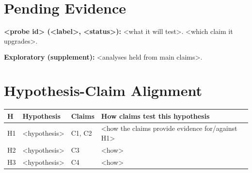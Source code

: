 \documentclass[11pt]{article}
\begin{document}
\section*{Pending Evidence}

\textbf{<probe id> (<label>, <status>):} <what it will test>. <which claim it upgrades>.

\textbf{Exploratory (supplement):} <analyses held from main claims>.

\section*{Hypothesis-Claim Alignment}

\begin{small}
\begin{tabularx}{\textwidth}{@{}p{} p{} p{} X@{}}
\toprule
H & Hypothesis & Claims & How claims test this hypothesis \\
\midrule
H1 & <hypothesis> & C1, C2 & <how the claims provide evidence for/against H1> \\
\addlinespace
H2 & <hypothesis> & C3 & <how> \\
\addlinespace
H3 & <hypothesis> & C4 & <how> \\
\bottomrule
\end{tabularx}
\end{small}
\end{document}
